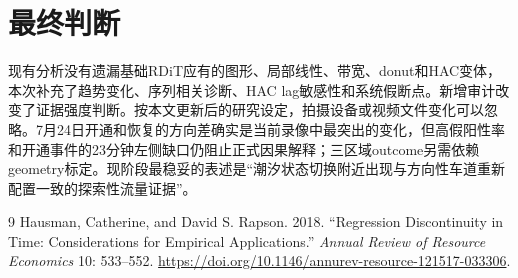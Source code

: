 \documentclass[11pt,a4paper]{ctexart}
\begin{document}
\section{最终判断}

现有分析没有遗漏基础RDiT应有的图形、局部线性、带宽、donut和HAC变体，本次补充了趋势变化、序列相关诊断、HAC lag敏感性和系统假断点。新增审计改变了证据强度判断。按本文更新后的研究设定，拍摄设备或视频文件变化可以忽略。7月24日开通和恢复的方向差确实是当前录像中最突出的变化，但高假阳性率和开通事件的23分钟左侧缺口仍阻止正式因果解释；三区域outcome另需依赖geometry标定。现阶段最稳妥的表述是“潮汐状态切换附近出现与方向性车道重新配置一致的探索性流量证据”。

\begin{thebibliography}{9}
Hausman, Catherine, and David S. Rapson. 2018.
``Regression Discontinuity in Time: Considerations for Empirical Applications.''
\emph{Annual Review of Resource Economics} 10: 533--552.
\url{https://doi.org/10.1146/annurev-resource-121517-033306}.
\end{thebibliography}
\end{document}
